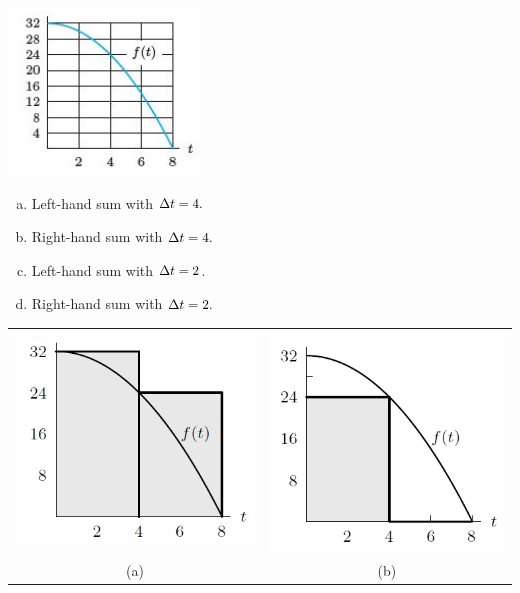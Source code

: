 \begin{enumerate}[1.]
\begin{multicols}{2}
\begin{Question}
\includegraphics[width=0.5\linewidth]{graphics/Week04_TheDefiniteIntegral/DefiniteIntegral2}
\begin{enumerate}[(a)]
\item Left-hand sum with $\Delta t = 4.$
\item Right-hand sum with $\Delta t = 4.$
\item Left-hand sum with $\Delta t = 2$.
\item Right-hand sum with $\Delta t = 2.$
\end{enumerate}
  \end{Question}

  \begin{Solution}
\begin{tabular}{cc}
\includegraphics[width=0.4\linewidth]{graphics/Week04_TheDefiniteIntegral/DefiniteIntegral2_solutions1} & 
\includegraphics[width=0.4\linewidth]{graphics/Week04_TheDefiniteIntegral/DefiniteIntegral2_solutions2} \\
(a) & (b) \\ 
\end{tabular}


\end{Solution}
\end{multicols}
\end{enumerate}

